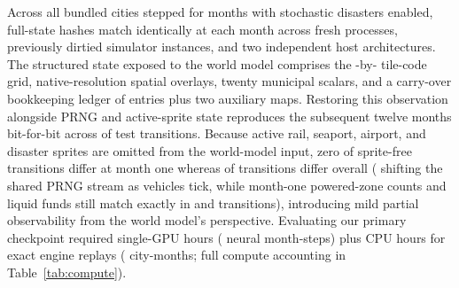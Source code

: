 Across all \OracleCities{} bundled cities stepped for \OracleMonths{} months with stochastic disasters enabled, full-state hashes match identically at each month across fresh processes, previously dirtied simulator instances, and two independent host architectures. The structured state exposed to the world model comprises the \WorldW{}-by-\WorldH{} tile-code grid, native-resolution spatial overlays, twenty municipal scalars, and a carry-over bookkeeping ledger of \LedgerEntries{} entries plus two auxiliary maps. Restoring this observation alongside PRNG and active-sprite state reproduces the subsequent twelve months bit-for-bit across \SuffExact{} of \SuffTransitions{} test transitions. Because active rail, seaport, airport, and disaster sprites are omitted from the world-model input, zero of \SuffSpriteFree{} sprite-free transitions differ at month one whereas \SuffNoSprites{} of \SuffTransitions{} transitions differ overall (\SuffRngShift{} shifting the shared PRNG stream as vehicles tick, while month-one powered-zone counts and liquid funds still match exactly in \SuffPowMatch{} and \SuffFundsMatch{} transitions), introducing mild partial observability from the world model's perspective. Evaluating our primary \SizeM{} checkpoint required \MainJudgeHours{} single-GPU hours (\MainJudgeMonthSteps{} neural month-steps) plus \MainEngineHours{} CPU hours for \MainEngineReplays{} exact engine replays (\MainEngineCityMonths{} city-months; full compute accounting in Table~\ref{tab:compute}).

